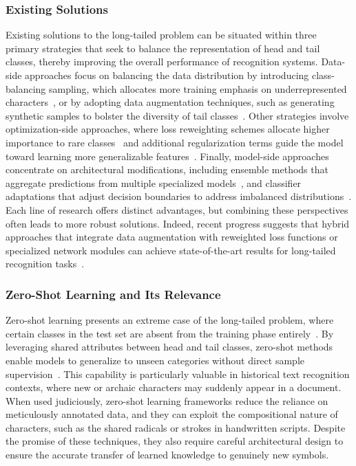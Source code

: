 \subsubsection{Existing Solutions}

Existing solutions to the long-tailed problem can be situated within three primary strategies that seek to balance the representation of head and tail classes, thereby improving the overall performance of recognition systems. Data-side approaches focus on balancing the data distribution by introducing class-balancing sampling, which allocates more training emphasis on underrepresented characters~\cite{upsam}, or by adopting data augmentation techniques, such as generating synthetic samples to bolster the diversity of tail classes~\cite{cutmix, smote, hzsl}. Other strategies involve optimization-side approaches, where loss reweighting schemes allocate higher importance to rare classes~\cite{focal,otem} and additional regularization terms guide the model toward learning more generalizable features~\cite{fudanvi,sanicdar23,logvar}. Finally, model-side approaches concentrate on architectural modifications, including ensemble methods that aggregate predictions from multiple specialized models~\cite{fle,flmoe}, and classifier adaptations that adjust decision boundaries to address imbalanced distributions~\cite{normrob}. Each line of research offers distinct advantages, but combining these perspectives often leads to more robust solutions. Indeed, recent progress suggests that hybrid approaches that integrate data augmentation with reweighted loss functions or specialized network modules can achieve state-of-the-art results for long-tailed recognition tasks~\cite{chen20dgan}.

\subsubsection{Zero-Shot Learning and Its Relevance}

Zero-shot learning presents an extreme case of the long-tailed problem, where certain classes in the test set are absent from the training phase entirely~\cite{gzsl-survey,olt}. By leveraging shared attributes between head and tail classes, zero-shot methods enable models to generalize to unseen categories without direct sample supervision~\cite{shen22}. This capability is particularly valuable in historical text recognition contexts, where new or archaic characters may suddenly appear in a document. When used judiciously, zero-shot learning frameworks reduce the reliance on meticulously annotated data, and they can exploit the compositional nature of characters, such as the shared radicals or strokes in handwritten scripts. Despite the promise of these techniques, they also require careful architectural design to ensure the accurate transfer of learned knowledge to genuinely new symbols.

